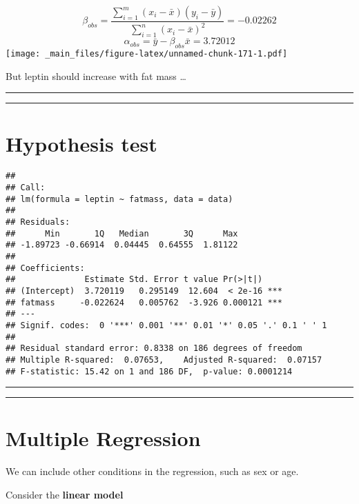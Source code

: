 \documentclass[
]{book}
\begin{document}
\[\beta_{obs}= \frac{\sum_{i=1}^m(x_i-\bar{x})(y_i-\bar{y})}{\sum_{i=1}^n(x_i-\bar{x})^2}= -0.02262\]
\[\alpha_{obs}=\bar{y}-\beta_{obs}\bar{x}= 3.72012\]
\texttt{[image: \_main\_files/figure-latex/unnamed-chunk-171-1.pdf]}

But leptin should increase with fat mass \ldots{}

\begin{center}\rule{0.5\linewidth}{0.5pt}\end{center}

\begin{center}\rule{0.5\linewidth}{0.5pt}\end{center}

\hypertarget{hypothesis-test}{%
\section{Hypothesis test}\label{hypothesis-test}}

\begin{verbatim}
## 
## Call:
## lm(formula = leptin ~ fatmass, data = data)
## 
## Residuals:
##      Min       1Q   Median       3Q      Max 
## -1.89723 -0.66914  0.04445  0.64555  1.81122 
## 
## Coefficients:
##              Estimate Std. Error t value Pr(>|t|)    
## (Intercept)  3.720119   0.295149  12.604  < 2e-16 ***
## fatmass     -0.022624   0.005762  -3.926 0.000121 ***
## ---
## Signif. codes:  0 '***' 0.001 '**' 0.01 '*' 0.05 '.' 0.1 ' ' 1
## 
## Residual standard error: 0.8338 on 186 degrees of freedom
## Multiple R-squared:  0.07653,    Adjusted R-squared:  0.07157 
## F-statistic: 15.42 on 1 and 186 DF,  p-value: 0.0001214
\end{verbatim}

\begin{center}\rule{0.5\linewidth}{0.5pt}\end{center}

\begin{center}\rule{0.5\linewidth}{0.5pt}\end{center}

\hypertarget{multiple-regression}{%
\section{Multiple Regression}\label{multiple-regression}}

We can include other conditions in the regression, such as sex or age.

Consider the \textbf{linear model}
\end{document}
